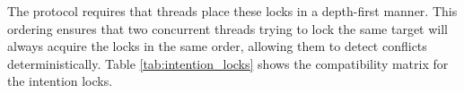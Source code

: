 The protocol requires that threads place these locks in a depth-first manner. This ordering ensures that two concurrent threads trying to lock the same target will always acquire the locks in the same order, allowing them to detect conflicts deterministically. Table \ref{tab:intention_locks} shows the compatibility matrix for the intention locks.




